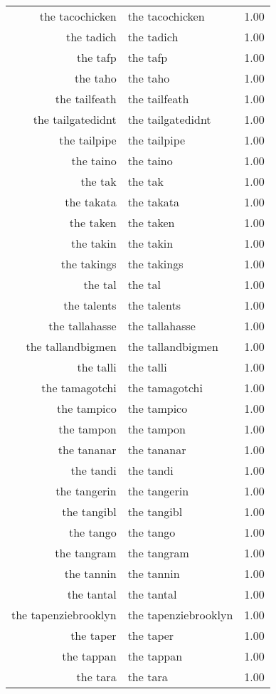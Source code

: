 \begin{table}[ht]
\begin{tabular}{rlr}
  the tacochicken & the tacochicken & 1.00 \\ 
  the tadich & the tadich & 1.00 \\ 
  the tafp & the tafp & 1.00 \\ 
  the taho & the taho & 1.00 \\ 
  the tailfeath & the tailfeath & 1.00 \\ 
  the tailgatedidnt & the tailgatedidnt & 1.00 \\ 
  the tailpipe & the tailpipe & 1.00 \\ 
  the taino & the taino & 1.00 \\ 
  the tak & the tak & 1.00 \\ 
  the takata & the takata & 1.00 \\ 
  the taken & the taken & 1.00 \\ 
  the takin & the takin & 1.00 \\ 
  the takings & the takings & 1.00 \\ 
  the tal & the tal & 1.00 \\ 
  the talents & the talents & 1.00 \\ 
  the tallahasse & the tallahasse & 1.00 \\ 
  the tallandbigmen & the tallandbigmen & 1.00 \\ 
  the talli & the talli & 1.00 \\ 
  the tamagotchi & the tamagotchi & 1.00 \\ 
  the tampico & the tampico & 1.00 \\ 
  the tampon & the tampon & 1.00 \\ 
  the tananar & the tananar & 1.00 \\ 
  the tandi & the tandi & 1.00 \\ 
  the tangerin & the tangerin & 1.00 \\ 
  the tangibl & the tangibl & 1.00 \\ 
  the tango & the tango & 1.00 \\ 
  the tangram & the tangram & 1.00 \\ 
  the tannin & the tannin & 1.00 \\ 
  the tantal & the tantal & 1.00 \\ 
  the tapenziebrooklyn & the tapenziebrooklyn & 1.00 \\ 
  the taper & the taper & 1.00 \\ 
  the tappan & the tappan & 1.00 \\ 
  the tara & the tara & 1.00 \\ 

\end{tabular}
\end{table}
